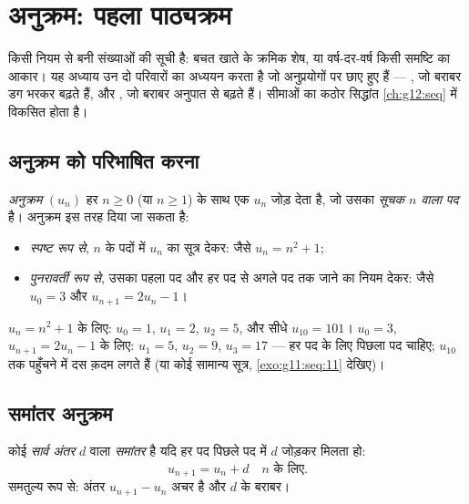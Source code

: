 \chapter{अनुक्रम: पहला पाठ्यक्रम}\label{ch:g11:seq}

 किसी नियम से बनी संख्याओं की सूची है: बचत खाते के क्रमिक शेष, या
वर्ष-दर-वर्ष किसी समष्टि का आकार। यह अध्याय उन दो परिवारों का अध्ययन करता है
जो अनुप्रयोगों पर छाए हुए हैं --- \emph{} , जो बराबर डग भरकर
बढ़ते हैं, और \emph{} , जो बराबर अनुपात से बढ़ते हैं। सीमाओं
का कठोर सिद्धांत \cref{ch:g12:seq} में विकसित होता है।

\section{अनुक्रम को परिभाषित करना}

\begin{definition}[अनुक्रम]\label{def:g11:seq:sequence}
\emph{अनुक्रम} $(u_n)$ हर  $n \geq 0$ (या $n \geq 1$) के साथ एक
 $u_n$ जोड़ देता है, जो उसका \emph{सूचक $n$ वाला पद} है।
अनुक्रम इस तरह दिया जा सकता है:
\begin{itemize}
  \item \emph{स्पष्ट रूप से}, $n$ के पदों में $u_n$ का सूत्र देकर: जैसे
        $u_n = n^2 + 1$;
  \item \emph{पुनरावर्ती रूप से}, उसका पहला पद और हर पद से अगले पद तक जाने
        का नियम देकर: जैसे $u_0 = 3$ और $u_{n+1} = 2u_n - 1$।
\end{itemize}
\end{definition}

\begin{example}
$u_n = n^2 + 1$ के लिए: $u_0 = 1$, $u_1 = 2$, $u_2 = 5$, और सीधे $u_{10} = 101$। $u_0 = 3$, $u_{n+1} = 2u_n - 1$ के लिए: $u_1 = 5$, $u_2 = 9$,
$u_3 = 17$ --- हर पद के लिए पिछला पद चाहिए; $u_{10}$ तक पहुँचने में दस क़दम लगते हैं
(या कोई सामान्य सूत्र, \cref{exo:g11:seq:11} देखिए)।
\end{example}

\section{समांतर अनुक्रम}

\begin{definition}[समांतर अनुक्रम]\label{def:g11:seq:arithmetic}
कोई  \emph{सार्व अंतर} $d$ वाला
\emph{समांतर}  है यदि हर पद पिछले पद में $d$
जोड़कर मिलता हो:
\[
u_{n+1} = u_n + d \quad n \text{ के लिए}.
\]
समतुल्य रूप से: अंतर $u_{n+1} - u_n$ अचर है और $d$ के बराबर।
\end{definition}

